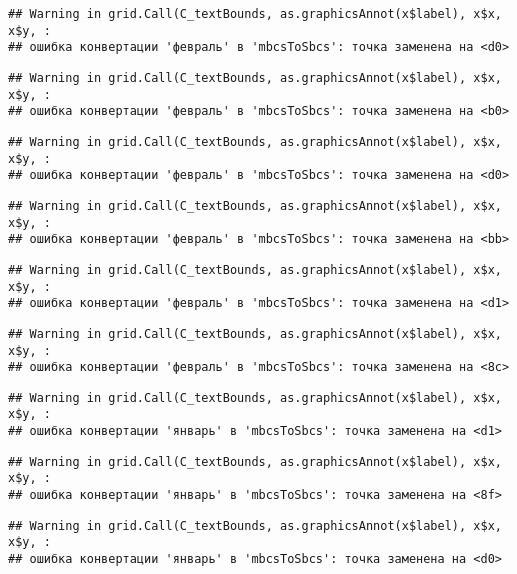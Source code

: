 \documentclass[
]{article}
\begin{document}
\begin{verbatim}
## Warning in grid.Call(C_textBounds, as.graphicsAnnot(x$label), x$x, x$y, :
## ошибка конвертации 'февраль' в 'mbcsToSbcs': точка заменена на <d0>
\end{verbatim}

\begin{verbatim}
## Warning in grid.Call(C_textBounds, as.graphicsAnnot(x$label), x$x, x$y, :
## ошибка конвертации 'февраль' в 'mbcsToSbcs': точка заменена на <b0>
\end{verbatim}

\begin{verbatim}
## Warning in grid.Call(C_textBounds, as.graphicsAnnot(x$label), x$x, x$y, :
## ошибка конвертации 'февраль' в 'mbcsToSbcs': точка заменена на <d0>
\end{verbatim}

\begin{verbatim}
## Warning in grid.Call(C_textBounds, as.graphicsAnnot(x$label), x$x, x$y, :
## ошибка конвертации 'февраль' в 'mbcsToSbcs': точка заменена на <bb>
\end{verbatim}

\begin{verbatim}
## Warning in grid.Call(C_textBounds, as.graphicsAnnot(x$label), x$x, x$y, :
## ошибка конвертации 'февраль' в 'mbcsToSbcs': точка заменена на <d1>
\end{verbatim}

\begin{verbatim}
## Warning in grid.Call(C_textBounds, as.graphicsAnnot(x$label), x$x, x$y, :
## ошибка конвертации 'февраль' в 'mbcsToSbcs': точка заменена на <8c>
\end{verbatim}

\begin{verbatim}
## Warning in grid.Call(C_textBounds, as.graphicsAnnot(x$label), x$x, x$y, :
## ошибка конвертации 'январь' в 'mbcsToSbcs': точка заменена на <d1>
\end{verbatim}

\begin{verbatim}
## Warning in grid.Call(C_textBounds, as.graphicsAnnot(x$label), x$x, x$y, :
## ошибка конвертации 'январь' в 'mbcsToSbcs': точка заменена на <8f>
\end{verbatim}

\begin{verbatim}
## Warning in grid.Call(C_textBounds, as.graphicsAnnot(x$label), x$x, x$y, :
## ошибка конвертации 'январь' в 'mbcsToSbcs': точка заменена на <d0>
\end{verbatim}
\end{document}

